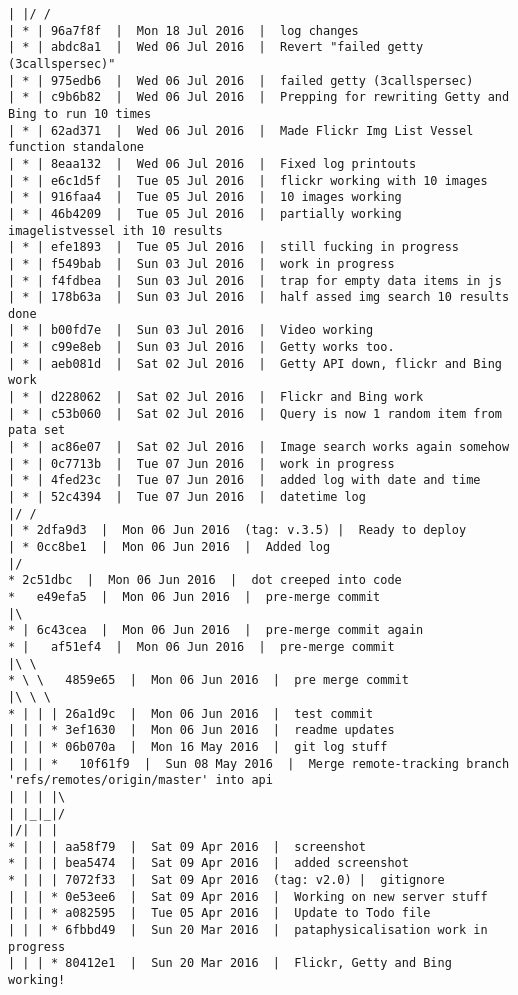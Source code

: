 \begin{verbatim}
| |/ /  
| * | 96a7f8f  |  Mon 18 Jul 2016  |  log changes
| * | abdc8a1  |  Wed 06 Jul 2016  |  Revert "failed getty (3callspersec)"
| * | 975edb6  |  Wed 06 Jul 2016  |  failed getty (3callspersec)
| * | c9b6b82  |  Wed 06 Jul 2016  |  Prepping for rewriting Getty and Bing to run 10 times
| * | 62ad371  |  Wed 06 Jul 2016  |  Made Flickr Img List Vessel function standalone
| * | 8eaa132  |  Wed 06 Jul 2016  |  Fixed log printouts
| * | e6c1d5f  |  Tue 05 Jul 2016  |  flickr working with 10 images
| * | 916faa4  |  Tue 05 Jul 2016  |  10 images working
| * | 46b4209  |  Tue 05 Jul 2016  |  partially working imagelistvessel ith 10 results
| * | efe1893  |  Tue 05 Jul 2016  |  still fucking in progress
| * | f549bab  |  Sun 03 Jul 2016  |  work in progress
| * | f4fdbea  |  Sun 03 Jul 2016  |  trap for empty data items in js
| * | 178b63a  |  Sun 03 Jul 2016  |  half assed img search 10 results done
| * | b00fd7e  |  Sun 03 Jul 2016  |  Video working
| * | c99e8eb  |  Sun 03 Jul 2016  |  Getty works too.
| * | aeb081d  |  Sat 02 Jul 2016  |  Getty API down, flickr and Bing work
| * | d228062  |  Sat 02 Jul 2016  |  Flickr and Bing work
| * | c53b060  |  Sat 02 Jul 2016  |  Query is now 1 random item from pata set
| * | ac86e07  |  Sat 02 Jul 2016  |  Image search works again somehow
| * | 0c7713b  |  Tue 07 Jun 2016  |  work in progress
| * | 4fed23c  |  Tue 07 Jun 2016  |  added log with date and time
| * | 52c4394  |  Tue 07 Jun 2016  |  datetime log
|/ /  
| * 2dfa9d3  |  Mon 06 Jun 2016  (tag: v.3.5) |  Ready to deploy
| * 0cc8be1  |  Mon 06 Jun 2016  |  Added log
|/  
* 2c51dbc  |  Mon 06 Jun 2016  |  dot creeped into code
*   e49efa5  |  Mon 06 Jun 2016  |  pre-merge commit
|\  
* | 6c43cea  |  Mon 06 Jun 2016  |  pre-merge commit again
* |   af51ef4  |  Mon 06 Jun 2016  |  pre-merge commit
|\ \  
* \ \   4859e65  |  Mon 06 Jun 2016  |  pre merge commit
|\ \ \  
* | | | 26a1d9c  |  Mon 06 Jun 2016  |  test commit
| | | * 3ef1630  |  Mon 06 Jun 2016  |  readme updates
| | | * 06b070a  |  Mon 16 May 2016  |  git log stuff
| | | *   10f61f9  |  Sun 08 May 2016  |  Merge remote-tracking branch 'refs/remotes/origin/master' into api
| | | |\  
| |_|_|/  
|/| | |   
* | | | aa58f79  |  Sat 09 Apr 2016  |  screenshot
* | | | bea5474  |  Sat 09 Apr 2016  |  added screenshot
* | | | 7072f33  |  Sat 09 Apr 2016  (tag: v2.0) |  gitignore
| | | * 0e53ee6  |  Sat 09 Apr 2016  |  Working on new server stuff
| | | * a082595  |  Tue 05 Apr 2016  |  Update to Todo file
| | | * 6fbbd49  |  Sun 20 Mar 2016  |  pataphysicalisation work in progress
| | | * 80412e1  |  Sun 20 Mar 2016  |  Flickr, Getty and Bing working!

\end{verbatim}

